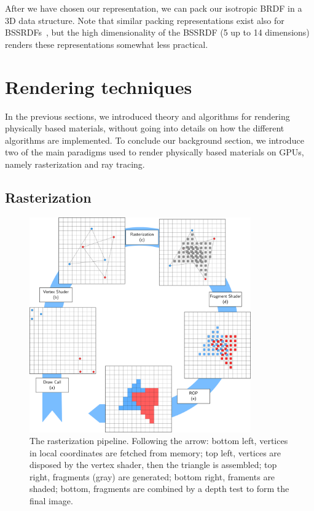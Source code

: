 After we have chosen our representation, we can pack our isotropic BRDF in a 3D data structure. Note that similar packing representations exist also for BSSRDFs~\cite{Donner2009}, but the high dimensionality of the BSSRDF (5 up to 14 dimensions) renders these representations somewhat less practical.

\section{Rendering techniques} 
\label{sec:renderingparadigms}

In the previous sections, we introduced theory and algorithms for rendering physically based materials, without going into details on how the different algorithms are implemented. To conclude our background section, we introduce two of the main paradigms used to render physically based materials on GPUs, namely rasterization and ray tracing. 

\subsection{Rasterization}

\begin{figure}
\centering
	 \includegraphics[width=0.85\textwidth]{figures/rasterization_pipeline.pdf} 
\caption{The rasterization pipeline. Following the arrow: bottom left, vertices in local coordinates are fetched from memory; top left, vertices are disposed by the vertex shader, then the triangle is assembled; top right, fragments (gray) are generated; bottom right, framents are shaded; bottom, fragments are combined by a depth test to form the final image. } 
\label{fig:rasterpipeline}
\end{figure}

